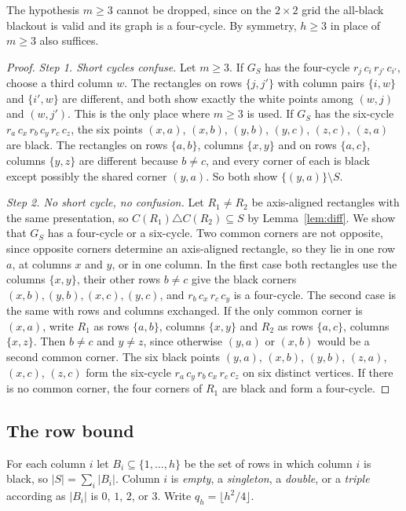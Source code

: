 The hypothesis $m\ge3$ cannot be dropped, since on the $2\times2$ grid the all-black blackout is valid and its graph is a four-cycle. By symmetry, $h\ge3$ in place of $m\ge3$ also suffices.

\begin{proof}
\emph{Step 1. Short cycles confuse.} Let $m\ge3$. If $G_S$ has the four-cycle $r_j\,c_i\,r_{j'}\,c_{i'}$, choose a third column $w$. The rectangles on rows $\{j,j'\}$ with column pairs $\{i,w\}$ and $\{i',w\}$ are different, and both show exactly the white points among $(w,j)$ and $(w,j')$. This is the only place where $m\ge3$ is used. If $G_S$ has the six-cycle $r_a\,c_x\,r_b\,c_y\,r_c\,c_z$, the six points $(x,a)$, $(x,b)$, $(y,b)$, $(y,c)$, $(z,c)$, $(z,a)$ are black. The rectangles on rows $\{a,b\}$, columns $\{x,y\}$ and on rows $\{a,c\}$, columns $\{y,z\}$ are different because $b\ne c$, and every corner of each is black except possibly the shared corner $(y,a)$. So both show $\{(y,a)\}\setminus S$.

\emph{Step 2. No short cycle, no confusion.} Let $R_1\ne R_2$ be axis-aligned rectangles with the same presentation, so $C(R_1)\triangle C(R_2)\subseteq S$ by Lemma~\ref{lem:diff}. We show that $G_S$ has a four-cycle or a six-cycle. Two common corners are not opposite, since opposite corners determine an axis-aligned rectangle, so they lie in one row $a$, at columns $x$ and $y$, or in one column. In the first case both rectangles use the columns $\{x,y\}$, their other rows $b\ne c$ give the black corners $(x,b),(y,b),(x,c),(y,c)$, and $r_b\,c_x\,r_c\,c_y$ is a four-cycle. The second case is the same with rows and columns exchanged. If the only common corner is $(x,a)$, write $R_1$ as rows $\{a,b\}$, columns $\{x,y\}$ and $R_2$ as rows $\{a,c\}$, columns $\{x,z\}$. Then $b\ne c$ and $y\ne z$, since otherwise $(y,a)$ or $(x,b)$ would be a second common corner. The six black points $(y,a)$, $(x,b)$, $(y,b)$, $(z,a)$, $(x,c)$, $(z,c)$ form the six-cycle $r_a\,c_y\,r_b\,c_x\,r_c\,c_z$ on six distinct vertices. If there is no common corner, the four corners of $R_1$ are black and form a four-cycle.
\end{proof}

\subsection{The row bound}

For each column $i$ let $B_i\subseteq\{1,\dots,h\}$ be the set of rows in which column $i$ is black, so $|S|=\sum_i|B_i|$. Column $i$ is \emph{empty}, a \emph{singleton}, a \emph{double}, or a \emph{triple} according as $|B_i|$ is $0$, $1$, $2$, or $3$. Write $q_h=\lfloor h^2/4\rfloor$.

